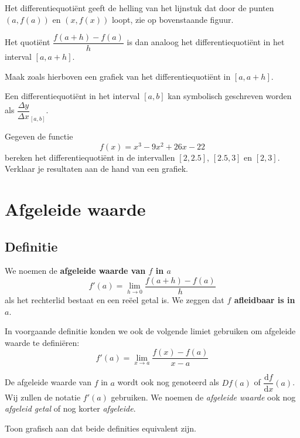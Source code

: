 \documentclass[a4paper,12pt,twoside]{article}
\newenvironment{definitie}{
  \begin{mdframed}[nobreak=true,frametitle={Definitie}]
  }{%
  \end{mdframed}
}
\begin{document}
Het differentiequotiënt geeft de helling van het lijnstuk dat door de punten $(a,f(a))$ en $(x,f(x))$ loopt, zie op bovenstaande figuur.

Het quotiënt $\dfrac{f(a+h)-f(a)}{h}$ is dan analoog het differentiequotiënt in het interval $[a, a+h]$.

\begin{oefening}
  Maak zoals hierboven een grafiek van het differentiequotiënt in $[a, a+h]$.
\end{oefening}

Een differentiequotiënt in het interval $[a,b]$ kan symbolisch geschreven worden als $\dfrac{\Delta y}{\Delta x}_{[a,b]}$.

\begin{oefening}
  Gegeven de functie
  $$f(x)=x^3-9x^2+26x-22$$
  bereken het differentiequotiënt in de intervallen $[2,2.5]$, $[2.5,3]$ en $[2,3]$. Verklaar je resultaten aan de hand van een grafiek.
\end{oefening}

\cleardoublepage
\section{Afgeleide waarde}

\subsection{Definitie}

\begin{definitie}
  We noemen de {\bf afgeleide waarde van $f$ in $a$}
  $$f'(a)=\lim_{h\to 0}\dfrac{f(a+h)-f(a)}{h}$$
  als het rechterlid bestaat en een reëel getal is. We zeggen dat {\bf $f$ afleidbaar is in $a$}.
\end{definitie}

In voorgaande definitie konden we ook de volgende limiet gebruiken om afgeleide waarde te definiëren:
$$f'(a)=\lim_{x\to a}\dfrac{f(x)-f(a)}{x-a}$$

De afgeleide waarde van $f$ in $a$ wordt ook nog genoteerd als $Df(a)$ of $\dfrac{\mbox{d}f}{\mbox{d}x}(a)$. Wij zullen de notatie $f'(a)$ gebruiken. We noemen de {\em afgeleide waarde} ook nog {\em afgeleid getal} of nog korter {\em afgeleide}.

\begin{oefening}
  Toon grafisch aan dat beide definities equivalent zijn.
\end{oefening}
\end{document}
